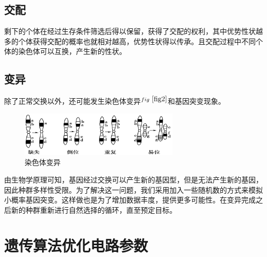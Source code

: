 \documentclass[14pt, a4paper]{article}
\begin{document}
    \subsection{交配}
        剩下的个体在经过生存条件筛选后得以保留，获得了交配的权利，其中优势性状越多的个体获得交配的概率也就相对越高，优势性状得以传承。且交配过程中不同个体的染色体可以互换，产生新的性状。
    \subsection{变异}
        除了正常交换以外，还可能发生染色体变异$^{fig\ \ref{fig2}}$和基因突变现象。 
        \begin{figure}[htbp]
            \centering
            \includegraphics[width = 3in]{fig/染色体变异.png}
            \caption{染色体变异}
            \label{fig2}
        \end{figure}
    
        由生物学原理可知，基因经过交换可以产生新的基因型，但是无法产生新的基因，因此种群多样性受限。为了解决这一问题，我们采用加入一些随机数的方式来模拟小概率基因突变。这样做也是为了增加数据丰度，提供更多可能性。在变异完成之后新的种群重新进行自然选择的循环，直至预定目标。

\section{遗传算法优化电路参数}
\end{document}
